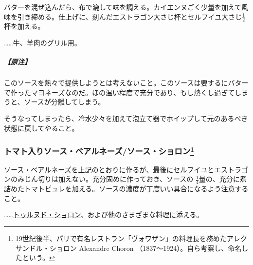 \begin{recette}
バターを混ぜ込んだら、布で漉して味を調える。カイエンヌごく少量を加えて風味を引き締める。仕上げに、刻んだエストラゴン大さじ杯とセルフイユ大さじ\(\frac{1}{2}\)杯を加える。

\ldots{}\ldots{}牛、羊肉のグリル用。

\hypertarget{nota-sauce-bearnaise}{%
\subparagraph{【原注】}\label{nota-sauce-bearnaise}}

このソースを熱々で提供しようとは考えないこと。このソースは要するにバターで作ったマヨネーズなのだ。ほの温い程度で充分であり、もし熱くし過ぎてしまうと、ソースが分離してしまう。

そうなってしまったら、冷水少々を加えて泡立て器でホイップして元のあるべき状態に戻してやること。

\hypertarget{sauce-bearnaise-tomatee}{%
\subsubsection[トマト入りソース・ベアルネーズ/ソース・ショロン]{\texorpdfstring{トマト入りソース・ベアルネーズ/ソース・ショロン\footnote{19世紀後半、パリで有名レストラン「ヴォワザン」の料理長を務めたアレクサンドル・ショロン
  Alexandre Choron （1837〜1924）。自ら考案し、命名したという。}}{トマト入りソース・ベアルネーズ/ソース・ショロン}}\label{sauce-bearnaise-tomatee}}



ソース・ベアルネーズを上記のとおりに作るが、最後にセルフイユとエストラゴンのみじん切りは加えない。充分固めに作っておき、ソースの
\(\frac{1}{4}\)量の、充分に煮詰めたトマトピュレを加える。ソースの濃度が丁度いい具合になるよう注意すること。

\ldots{}\ldots{}\protect\hyperlink{tournedos-choron}{トゥルヌド・ショロン}、および他のさまざまな料理に添える。


\end{recette}
